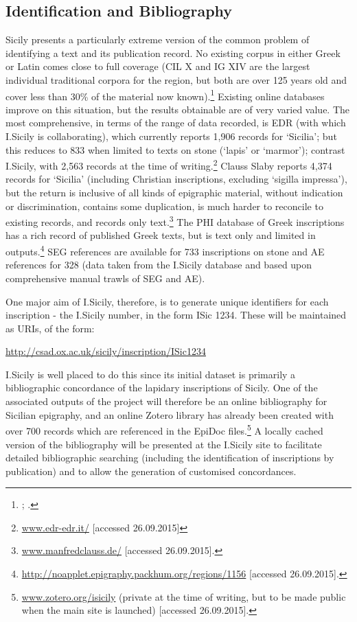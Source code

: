 \documentclass[amsthm,ebook]{saparticle}
\begin{document}
\subsection{Identification and Bibliography}


\noindent Sicily presents a particularly extreme version of the common problem of identifying a text and its publication record.
No existing corpus in either Greek or Latin comes close to full coverage (CIL X and IG XIV are the largest individual
traditional corpora for the region, but both are over 125 years old and cover less than 30\% of the material now
known).\footnote{\citet{_inscriptiones_1883}; \citet{kaibel_inscriptiones_1890}.} Existing online databases improve on this situation, but the results
obtainable are of very varied value. The most comprehensive, in terms of the range of data recorded, is EDR (with which
I.Sicily is collaborating), which currently reports 1,906 records for `Sicilia'; but this reduces to 833 when limited
to texts on stone (`lapis' or `marmor'); contrast I.Sicily, with 2,563 records at the time of writing.\footnote{
\url{www.edr-edr.it/} [accessed 26.09.2015]} Clauss Slaby reports 4,374 records for `Sicilia' (including Christian
inscriptions, excluding `sigilla impressa'), but the return is inclusive of all kinds of epigraphic material, without
indication or discrimination, contains some duplication, is much harder to reconcile to existing records, and records
only text.\footnote{ \url{www.manfredclauss.de/} [accessed 26.09.2015].} The PHI database of Greek inscriptions has a rich
record of published Greek texts, but is text only and limited in outputs.\footnote{
\url{http://noapplet.epigraphy.packhum.org/regions/1156} [accessed 26.09.2015].} SEG references are available for 733
inscriptions on stone and AE references for 328 (data taken from the I.Sicily database and based upon comprehensive
manual trawls of SEG and AE).

One major aim of I.Sicily, therefore, is to generate unique identifiers for each inscription - the I.Sicily number, in
the form ISic 1234. These will be maintained as URIs, of the form:

\url{http://csad.ox.ac.uk/sicily/inscription/ISic1234}

I.Sicily is well placed to do this since its initial dataset is primarily a bibliographic concordance of the lapidary
inscriptions of Sicily. One of the associated outputs of the project will therefore be an online bibliography for
Sicilian epigraphy, and an online Zotero library has already been created with over 700 records which are referenced in
the EpiDoc files.\footnote{\url{www.zotero.org/isicily} (private at the time of writing, but to be made public when the main
site is launched) [accessed 26.09.2015].} A locally cached version of the bibliography will be presented at the
I.Sicily site to facilitate detailed bibliographic searching (including the identification of inscriptions by
publication) and to allow the generation of customised concordances.
\end{document}
